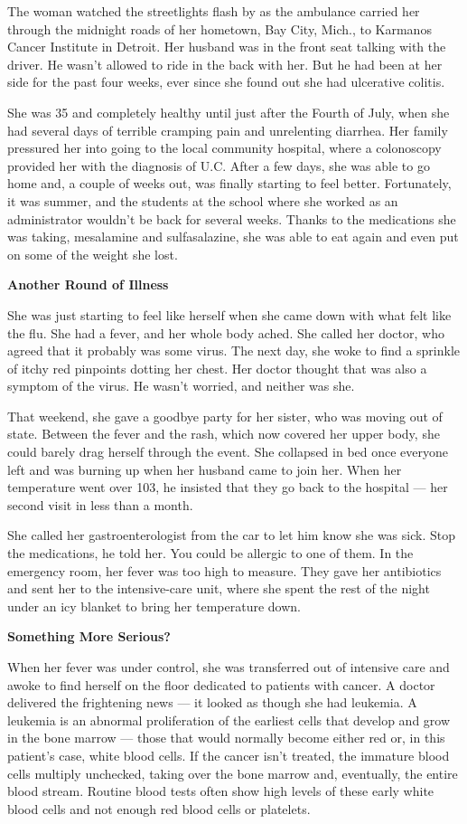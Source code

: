 The woman watched the streetlights flash by as the ambulance carried her
through the midnight roads of her hometown, Bay City, Mich., to Karmanos
Cancer Institute in Detroit. Her husband was in the front seat talking
with the driver. He wasn't allowed to ride in the back with her. But he
had been at her side for the past four weeks, ever since she found out
she had ulcerative colitis.

She was 35 and completely healthy until just after the Fourth of July,
when she had several days of terrible cramping pain and unrelenting
diarrhea. Her family pressured her into going to the local community
hospital, where a colonoscopy provided her with the diagnosis of U.C.
After a few days, she was able to go home and, a couple of weeks out,
was finally starting to feel better. Fortunately, it was summer, and the
students at the school where she worked as an administrator wouldn't be
back for several weeks. Thanks to the medications she was taking,
mesalamine and sulfasalazine, she was able to eat again and even put on
some of the weight she lost.

\textbf{Another Round of Illness}

She was just starting to feel like herself when she came down with what
felt like the flu. She had a fever, and her whole body ached. She called
her doctor, who agreed that it probably was some virus. The next day,
she woke to find a sprinkle of itchy red pinpoints dotting her chest.
Her doctor thought that was also a symptom of the virus. He wasn't
worried, and neither was she.

That weekend, she gave a goodbye party for her sister, who was moving
out of state. Between the fever and the rash, which now covered her
upper body, she could barely drag herself through the event. She
collapsed in bed once everyone left and was burning up when her husband
came to join her. When her temperature went over 103, he insisted that
they go back to the hospital --- her second visit in less than a month.

She called her gastroenterologist from the car to let him know she was
sick. Stop the medications, he told her. You could be allergic to one of
them. In the emergency room, her fever was too high to measure. They
gave her antibiotics and sent her to the intensive-care unit, where she
spent the rest of the night under an icy blanket to bring her
temperature down.

\textbf{Something More Serious?}

When her fever was under control, she was transferred out of intensive
care and awoke to find herself on the floor dedicated to patients with
cancer. A doctor delivered the frightening news --- it looked as though
she had leukemia. A leukemia is an abnormal proliferation of the
earliest cells that develop and grow in the bone marrow --- those that
would normally become either red or, in this patient's case, white blood
cells. If the cancer isn't treated, the immature blood cells multiply
unchecked, taking over the bone marrow and, eventually, the entire blood
stream. Routine blood tests often show high levels of these early white
blood cells and not enough red blood cells or platelets.

